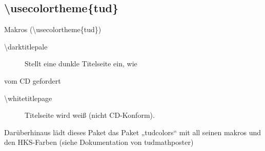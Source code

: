 \documentclass[presentation,t]{beamer}
\begin{document}
\subsection{\textbackslash usecolortheme\{tud\}}
\label{sec-2-4}

\begin{frame}[label=sec-2-4-1]{Makros (\textbackslash usecolortheme\{tud\})}
\begin{description}
\item[{\textbackslash darktitlepale}] Stellt eine dunkle Titelseite ein, wie
\end{description}
vom CD gefordert
\begin{description}
\item[{\textbackslash whitetitlepage}] Titelseite wird weiß (nicht CD-Konform).
\end{description}

Darüberhinaus lädt dieses Paket das Paket „tudcolors“ mit all seinen
makros und den HKS-Farben (siehe Dokumentation von tudmathposter)
\end{frame}
\end{document}
